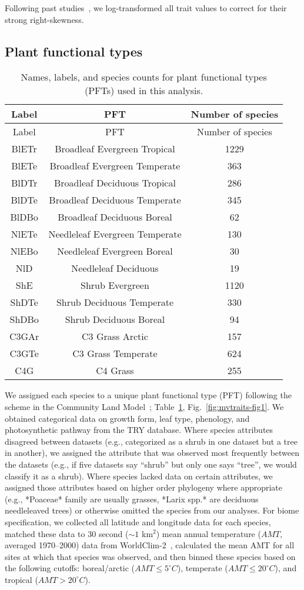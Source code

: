 Following past studies~\cite{wright_worldwide_2004,wright_assessing_2005,onoda_2011_global,diaz_global_2016}, we log-transformed all trait values to correct for their strong right-skewness.

\subsection{Plant functional types}

\begin{longtable}[]{@{}ccc@{}}
\caption{\label{tab:pfts}Names, labels, and species counts for plant
functional types (PFTs) used in this analysis.}\tabularnewline
\toprule
Label & PFT & Number of species\tabularnewline
\midrule
\endfirsthead
\toprule
Label & PFT & Number of species\tabularnewline
\midrule
\endhead
BlETr & Broadleaf Evergreen Tropical & 1229\tabularnewline
BlETe & Broadleaf Evergreen Temperate & 363\tabularnewline
BlDTr & Broadleaf Deciduous Tropical & 286\tabularnewline
BlDTe & Broadleaf Deciduous Temperate & 345\tabularnewline
BlDBo & Broadleaf Deciduous Boreal & 62\tabularnewline
NlETe & Needleleaf Evergreen Temperate & 130\tabularnewline
NlEBo & Needleleaf Evergreen Boreal & 30\tabularnewline
NlD & Needleleaf Deciduous & 19\tabularnewline
ShE & Shrub Evergreen & 1120\tabularnewline
ShDTe & Shrub Deciduous Temperate & 330\tabularnewline
ShDBo & Shrub Deciduous Boreal & 94\tabularnewline
C3GAr & C3 Grass Arctic & 157\tabularnewline
C3GTe & C3 Grass Temperate & 624\tabularnewline
C4G & C4 Grass & 255\tabularnewline
\bottomrule
\end{longtable}

We assigned each species to a unique plant functional type (PFT) following the scheme in the Community Land Model~\cite[CLM4.5,][]{clm45_note}; Table~\ref{tab:pfts}, Fig.~\ref{fig:mvtraits-fig1}. %
We obtained categorical data on growth form, leaf type, phenology, and photosynthetic pathway from the TRY database.
Where species attributes disagreed between datasets (e.g., categorized as a shrub in one dataset but a tree in another), we assigned the attribute that was observed most frequently between the datasets (e.g., if five datasets say ``shrub'' but only one says ``tree'', we would classify it as a shrub).
Where species lacked data on certain attributes, we assigned those attributes based on higher order phylogeny where appropriate (e.g., *Poaceae* family are usually grasses, *Larix spp.* are deciduous needleleaved trees) or otherwise omitted the species from our analyses.
For biome specification, we collected all latitude and longitude data for each species,
matched these data to 30 second ($\sim1$ km$^{2}$) mean annual temperature ($AMT$, averaged 1970--2000) data from WorldClim-2~\cite{worldclim},
calculated the mean AMT for all sites at which that species was observed,
and then binned these species based on the following cutoffs: boreal/arctic ($AMT \leq 5^\circ C$), temperate ($AMT \leq 20^\circ C$), and tropical ($AMT > 20^\circ C$).

